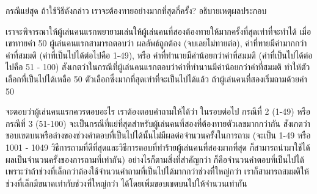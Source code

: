 \begin{quiz}{กรณี{\wbr}แย่{\wbr}สุด}
ถ้า{\wbr}ใช้{\wbr}วิธี{\wbr}ดังกล่าว เรา{\wbr}จะ{\wbr}ต้อง{\wbr}ทาย{\wbr}อย่าง{\wbr}มาก{\wbr}ที่สุด{\wbr}กี่{\wbr}ครั้ง?  อธิบาย{\wbr}เหตุผล{\wbr}ประกอบ{\wbr}
\end{quiz}
\begin{quizans}
เรา{\wbr}จะ{\wbr}พิจารณา{\wbr}ให้{\wbr}ผู้{\wbr}เล่น{\wbr}คน{\wbr}แรก{\wbr}พยายาม{\wbr}เล่น{\wbr}ให้{\wbr}ผู้{\wbr}เล่น{\wbr}คน{\wbr}ที่{\wbr}สอง{\wbr}ต้อง{\wbr}ทาย{\wbr}ให้{\wbr}มาก{\wbr}ครั้ง{\wbr}ที่สุด{\wbr}เท่า{\wbr}ที่{\wbr}จะ{\wbr}ทำ{\wbr}ได้{\wbr}
เมื่อ{\wbr}เขา{\wbr}ทาย{\wbr}ค่า 50 ผู้{\wbr}เล่น{\wbr}คน{\wbr}แรก{\wbr}สามารถ{\wbr}ตอบ{\wbr}ว่า ผลลัพธ์{\wbr}ถูกต้อง (จบ{\wbr}เลย{\wbr}ไม่{\wbr}ทาย{\wbr}ต่อ),
ค่า{\wbr}ที่{\wbr}ทาย{\wbr}มี{\wbr}ค่า{\wbr}มาก{\wbr}กว่า{\wbr}ค่า{\wbr}ที่{\wbr}สมมติ (ค่า{\wbr}ที่{\wbr}เป็น{\wbr}ไป{\wbr}ได้{\wbr}ต่อไป{\wbr}คือ 1-49), หรือ{\wbr}
ค่า{\wbr}ที่{\wbr}ทำนาย{\wbr}มี{\wbr}ค่า{\wbr}น้อย{\wbr}กว่า{\wbr}ค่า{\wbr}ที่{\wbr}สมมติ (ค่า{\wbr}ที่{\wbr}เป็น{\wbr}ไป{\wbr}ได้{\wbr}ต่อไป{\wbr}คือ 51 - 100)
สังเกต{\wbr}ว่า{\wbr}ใน{\wbr}กรณี{\wbr}ที่{\wbr}ผู้{\wbr}เล่น{\wbr}คน{\wbr}แรก{\wbr}ตอบ{\wbr}ว่า{\wbr}ค่า{\wbr}ที่{\wbr}ทำ{\wbr}นาน{\wbr}มี{\wbr}ค่า{\wbr}น้อย{\wbr}กว่า{\wbr}ค่า{\wbr}ที่{\wbr}สมมติ{\wbr}
ทำ{\wbr}ให้{\wbr}ตัวเลือก{\wbr}ที่{\wbr}เป็น{\wbr}ไป{\wbr}ได้{\wbr}เหลือ 50 ตัวเลือก{\wbr}ซึ่ง{\wbr}มาก{\wbr}ที่สุด{\wbr}เท่า{\wbr}ที่{\wbr}จะ{\wbr}เป็น{\wbr}ไป{\wbr}ได้{\wbr}แล้ว{\wbr}
ถ้า{\wbr}ผู้{\wbr}เล่น{\wbr}คน{\wbr}ที่{\wbr}สอง{\wbr}เริ่ม{\wbr}ถาม{\wbr}ด้วย{\wbr}ค่า 50

จะ{\wbr}ตอบ{\wbr}ว่า{\wbr}ผู้{\wbr}เล่น{\wbr}คน{\wbr}แรก{\wbr}ควร{\wbr}ตอบ{\wbr}อะไร เรา{\wbr}ต้อง{\wbr}ตอบ{\wbr}คำถาม{\wbr}ให้{\wbr}ได้{\wbr}ว่า ใน{\wbr}รอบ{\wbr}ต่อไป กรณี{\wbr}ที่ 2
(1-49) หรือ{\wbr}กรณี{\wbr}ที่ 3 (51-100)
จะ{\wbr}เป็น{\wbr}กรณี{\wbr}ที่{\wbr}แย่{\wbr}ที่สุด{\wbr}สำหรับ{\wbr}ผู้{\wbr}เล่น{\wbr}คน{\wbr}ที่{\wbr}สอง{\wbr}ที่{\wbr}ต้อง{\wbr}ทาย{\wbr}ตัวเลข{\wbr}มาก{\wbr}กว่า{\wbr}กัน{\wbr}
สังเกต{\wbr}ว่า{\wbr}ขอบเขต{\wbr}บน{\wbr}หรือ{\wbr}ล่าง{\wbr}ของ{\wbr}ช่วง{\wbr}คำตอบ{\wbr}ที่{\wbr}เป็น{\wbr}ไป{\wbr}ได้{\wbr}นั้น{\wbr}ไม่{\wbr}มี{\wbr}ผล{\wbr}ต่อ{\wbr}จำนวน{\wbr}ครั้ง{\wbr}ใน{\wbr}การ{\wbr}ถาม{\wbr}
(จะ{\wbr}เป็น 1-49 หรือ 1001 - 1049
วิธีการ{\wbr}ถาม{\wbr}ที่{\wbr}ดี{\wbr}ที่สุด{\wbr}และ{\wbr}วิธีการ{\wbr}ตอบ{\wbr}ที่{\wbr}ทำร้าย{\wbr}ผู้{\wbr}เล่น{\wbr}คน{\wbr}ที่{\wbr}สอง{\wbr}มาก{\wbr}ที่สุด{\wbr}
ก็{\wbr}สามารถ{\wbr}นำมา{\wbr}ใช้ได้{\wbr}ผล{\wbr}เป็น{\wbr}จำนวน{\wbr}ครั้ง{\wbr}ของ{\wbr}การ{\wbr}ถาม{\wbr}ที่{\wbr}เท่า{\wbr}กัน) อย่างไรก็ตาม{\wbr}สิ่ง{\wbr}ที่{\wbr}สำคัญ{\wbr}กว่า{\wbr}
ก็{\wbr}คือ{\wbr}จำนวน{\wbr}คำตอบ{\wbr}ที่{\wbr}เป็น{\wbr}ไป{\wbr}ได้{\wbr}
เพราะว่า{\wbr}ถ้า{\wbr}ช่วง{\wbr}ที่{\wbr}เล็ก{\wbr}กว่า{\wbr}ต้อง{\wbr}ใช้{\wbr}จำนวน{\wbr}คำถาม{\wbr}ที่{\wbr}เป็น{\wbr}ไป{\wbr}ได้{\wbr}มาก{\wbr}กว่า{\wbr}ช่วง{\wbr}ที่{\wbr}ใหญ่{\wbr}กว่า{\wbr}
เรา{\wbr}ก็{\wbr}สามารถ{\wbr}สมมติ{\wbr}ให้{\wbr}ช่วง{\wbr}ที่{\wbr}เล็ก{\wbr}มี{\wbr}ขนาด{\wbr}เท่า{\wbr}กับ{\wbr}ช่วง{\wbr}ที่{\wbr}ใหญ่{\wbr}กว่า{\wbr}
ได้{\wbr}โดย{\wbr}เพิ่ม{\wbr}ขอบเขต{\wbr}บน{\wbr}ไป{\wbr}ให้{\wbr}จำนวน{\wbr}เท่า{\wbr}กัน 


\end{quizans}
